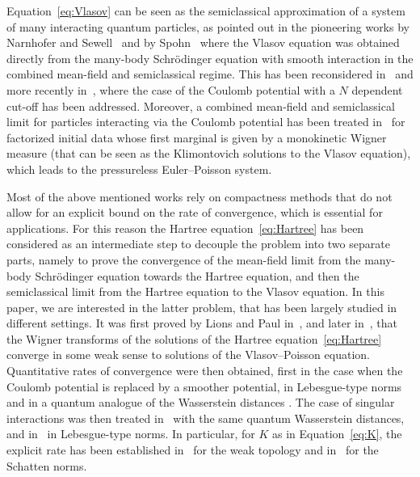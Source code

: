 \documentclass[JEP,XML,SOM,Unicode,NoEqCountersInSection,published]{cedram}
\theoremstyle{definition}
\renewcommand {\(} {\lt(}
\renewcommand {\)} {\rt)}
\begin{document}
Equation~\eqref{eq:Vlasov} can be seen as the semiclassical approximation of a system of many interacting quantum particles, as pointed out in the pioneering works by Narnhofer and Sewell~\cite{narnhofer_vlasov_1981} and by Spohn~\cite{spohn_vlasov_1981} where the Vlasov equation was obtained directly from the many-body Schrödinger equation with smooth interaction in the combined mean-field and semiclassical regime. This has been reconsidered in~\cite{graffi_mean-field_2003} and more recently in~\cite{chong_many-body_2021, chen_combined_2021}, where the case of the Coulomb potential with a $N$ dependent cut-off has been addressed. Moreover, a combined mean-field and semiclassical limit for particles interacting via the Coulomb potential has been treated in~\cite{golse_mean-field_2021} for factorized initial data whose first marginal is given by a monokinetic Wigner measure (that can be seen as the Klimontovich solutions to the Vlasov equation), which leads to the pressureless Euler--Poisson system.

Most of the above mentioned works rely on compactness methods that do not allow for an explicit bound on the rate of convergence, which is essential for applications. For this reason the Hartree equation~\eqref{eq:Hartree} has been considered as an intermediate step to decouple the problem into two separate parts, namely to prove the convergence of the mean-field limit from the many-body Schrödinger equation towards the Hartree equation, and then the semiclassical limit from the Hartree equation to the Vlasov equation. In this paper, we are interested in the latter problem, that has been largely studied in different settings. It was first proved by Lions and Paul in~\cite{lions_sur_1993}, and later in~\cite{markowich_classical_1993,figalli_semiclassical_2012}, that the Wigner transforms of the solutions of the Hartree equation~\eqref{eq:Hartree} converge in some weak sense to solutions of the Vlasov--Poisson equation. Quantitative rates of convergence were then obtained, first in the case when the Coulomb potential is replaced by a smoother potential, in Lebesgue-type norms~\cite{athanassoulis_strong_2011, amour_semiclassical_2013, benedikter_hartree_2016} and in a quantum analogue of the Wasserstein distances \cite{golse_schrodinger_2017}. The case of singular interactions was then treated in~\cite{lafleche_propagation_2019, lafleche_global_2021} with the same quantum Wasserstein distances, and in~\cite{saffirio_semiclassical_2019, saffirio_hartree_2020, lafleche_strong_2021} in Lebesgue-type norms. In particular, for $K$ as in Equation~\eqref{eq:K}, the explicit rate has been established in~\cite{lafleche_propagation_2019} for the weak topology and in~\cite{saffirio_hartree_2020, lafleche_strong_2021} for the Schatten norms.
\end{document}
